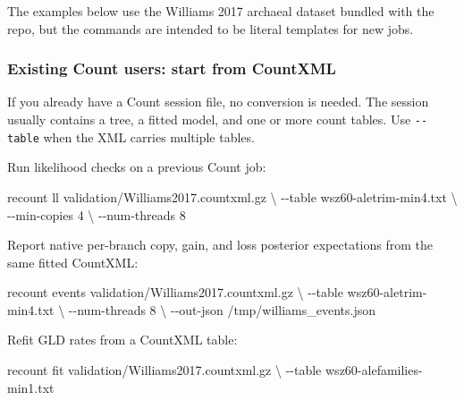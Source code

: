 \documentclass[
  10pt,
]{article}
\newenvironment{Shaded}{}{}
\newcommand{\AttributeTok}[1]{\textcolor[rgb]{0.49,0.56,0.16}{#1}}
\newcommand{\DataTypeTok}[1]{\textcolor[rgb]{0.56,0.13,0.00}{#1}}
\newcommand{\ExtensionTok}[1]{#1}
\newcommand{\NormalTok}[1]{#1}
\begin{document}
The examples below use the Williams 2017 archaeal dataset bundled with
the repo, but the commands are intended to be literal templates for new
jobs.

\subsubsection{Existing Count users: start from
CountXML}\label{existing-count-users-start-from-countxml}

If you already have a Count session file, no conversion is needed. The
session usually contains a tree, a fitted model, and one or more count
tables. Use \texttt{-\/-table} when the XML carries multiple tables.

Run likelihood checks on a previous Count job:

\begin{Shaded}
\begin{Highlighting}[]
\ExtensionTok{recount}\NormalTok{ ll validation/Williams2017.countxml.gz }\DataTypeTok{\textbackslash{}}
    \AttributeTok{{-}{-}table}\NormalTok{ wsz60{-}aletrim{-}min4.txt }\DataTypeTok{\textbackslash{}}
    \AttributeTok{{-}{-}min{-}copies}\NormalTok{ 4 }\DataTypeTok{\textbackslash{}}
    \AttributeTok{{-}{-}num{-}threads}\NormalTok{ 8}
\end{Highlighting}
\end{Shaded}

Report native per-branch copy, gain, and loss posterior expectations
from the same fitted CountXML:

\begin{Shaded}
\begin{Highlighting}[]
\ExtensionTok{recount}\NormalTok{ events validation/Williams2017.countxml.gz }\DataTypeTok{\textbackslash{}}
    \AttributeTok{{-}{-}table}\NormalTok{ wsz60{-}aletrim{-}min4.txt }\DataTypeTok{\textbackslash{}}
    \AttributeTok{{-}{-}num{-}threads}\NormalTok{ 8 }\DataTypeTok{\textbackslash{}}
    \AttributeTok{{-}{-}out{-}json}\NormalTok{ /tmp/williams\_events.json}
\end{Highlighting}
\end{Shaded}

Refit GLD rates from a CountXML table:

\begin{Shaded}
\begin{Highlighting}[]
\ExtensionTok{recount}\NormalTok{ fit validation/Williams2017.countxml.gz }\DataTypeTok{\textbackslash{}}
    \AttributeTok{{-}{-}table}\NormalTok{ wsz60{-}alefamilies{-}min1.txt}
\end{Highlighting}
\end{Shaded}
\end{document}
